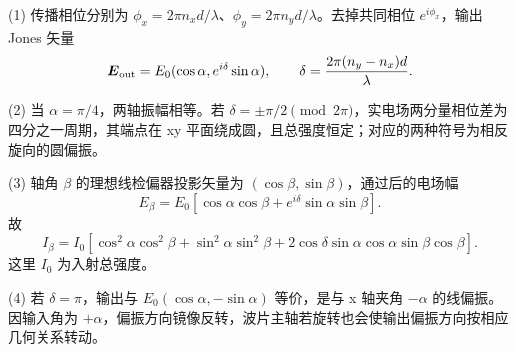 (1) 传播相位分别为 \(\phi_x=2\pi n_xd/\lambda\)、\(\phi_y=2\pi n_yd/\lambda\)。去掉共同相位 \(e^{i\phi_x}\)，输出 Jones 矢量
\[
\boldsymbol E_{\rm out}=E_0(\cos\alpha,e^{i\delta}\sin\alpha),\qquad
\delta=\frac{2\pi(n_y-n_x)d}{\lambda}.
\]

(2) 当 \(\alpha=\pi/4\)，两轴振幅相等。若 \(\delta=\pm\pi/2\pmod{2\pi}\)，实电场两分量相位差为四分之一周期，其端点在 xy 平面绕成圆，且总强度恒定；对应的两种符号为相反旋向的圆偏振。

(3) 轴角 \(\beta \) 的理想线检偏器投影矢量为 \((\cos\beta,\sin\beta)\)，通过后的电场幅
\[
E_\beta=E_0[\cos\alpha\cos\beta+e^{i\delta}\sin\alpha\sin\beta].
\]
故
\[
I_\beta=I_0[\cos^2\alpha\cos^2\beta+
\sin^2\alpha\sin^2\beta+
2\cos\delta\sin\alpha\cos\alpha\sin\beta\cos\beta].
\]
这里 \(I_0\) 为入射总强度。

(4) 若 \(\delta=\pi\)，输出与 \(E_0(\cos\alpha,-\sin\alpha)\) 等价，是与 x 轴夹角 \(-\alpha\) 的线偏振。因输入角为 \(+\alpha\)，偏振方向镜像反转，波片主轴若旋转也会使输出偏振方向按相应几何关系转动。
